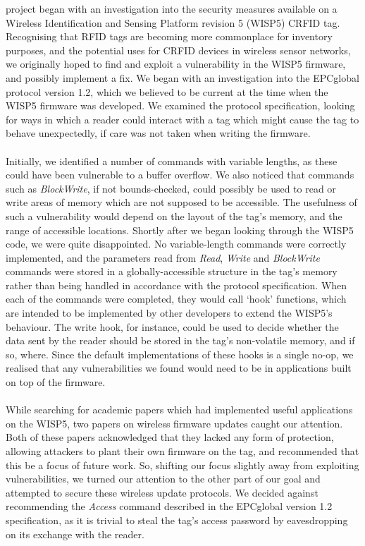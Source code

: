 \documentclass[journal]{IEEEtran}
\begin{document}
 project began with an investigation into the security measures available on a Wireless Identification and Sensing Platform revision 5 (WISP5) CRFID tag.\cite{wisp}
Recognising that RFID tags are becoming more commonplace for inventory purposes, and the potential uses for CRFID devices in wireless sensor networks, we originally hoped to find and exploit a vulnerability in the WISP5 firmware, and possibly implement a fix.
We began with an investigation into the EPCglobal protocol version 1.2,\cite{epc12} which we believed to be current at the time when the WISP5 firmware was developed.
We examined the protocol specification, looking for ways in which a reader could interact with a tag which might cause the tag to behave unexpectedly, if care was not taken when writing the firmware.
\\\\
Initially, we identified a number of commands with variable lengths, as these could have been vulnerable to a buffer overflow.
We also noticed that commands such as \textit{BlockWrite}, if not bounds-checked, could possibly be used to read or write areas of memory which are not supposed to be accessible.
The usefulness of such a vulnerability would depend on the layout of the tag's memory, and the range of accessible locations.
Shortly after we began looking through the WISP5 code, we were quite disappointed.
No variable-length commands were correctly implemented, and the parameters read from \textit{Read}, \textit{Write} and \textit{BlockWrite} commands were stored in a globally-accessible structure in the tag's memory rather than being handled in accordance with the protocol specification.
When each of the commands were completed, they would call `hook' functions, which are intended to be implemented by other developers to extend the WISP5's behaviour.
The write hook, for instance, could be used to decide whether the data sent by the reader should be stored in the tag's non-volatile memory, and if so, where.
Since the default implementations of these hooks is a single no-op, we realised that any vulnerabilities we found would need to be in applications built on top of the firmware.
\\\\
While searching for academic papers which had implemented useful applications on the WISP5, two papers on wireless firmware updates caught our attention. \cite{r2,wisent}
Both of these papers acknowledged that they lacked any form of protection, allowing attackers to plant their own firmware on the tag, and recommended that this be a focus of future work.
So, shifting our focus slightly away from exploiting vulnerabilities, we turned our attention to the other part of our goal and attempted to secure these wireless update protocols.
We decided against recommending the \textit{Access} command described in the EPCglobal version 1.2 specification, as it is trivial to steal the tag's access password by eavesdropping on its exchange with the reader.
\end{document}
